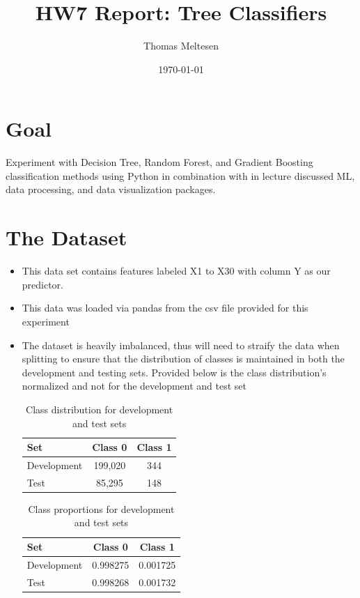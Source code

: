\documentclass[12pt]{article}
\title {HW7 Report: Tree Classifiers}
\author{Thomas Meltesen}
\date{\today}
\begin{document}
\maketitle

\section{Goal}
Experiment with Decision Tree, Random Forest, and Gradient Boosting
classification methods using Python in combination with in lecture discussed ML, data processing, and data
visualization packages.

\section{The Dataset}
\begin{itemize}
    \item This data set contains features labeled X1 to X30 with column Y as our predictor.
    \item This data was loaded via pandas from the csv file provided for this experiment
    \item The dataset is heavily imbalanced, thus will need to straify the data when splitting to ensure that the distribution of classes is maintained in both the development and testing sets. Provided below is the class distribution's normalized and not for the development and test set
\begin{table}[h!]
\centering
\begin{tabular}{lcc}
\hline
\textbf{Set} & \textbf{Class 0} & \textbf{Class 1} \\
\hline
Development & 199,020 & 344 \\
Test        & 85,295  & 148 \\
\hline
\end{tabular}
\caption{Class distribution for development and test sets}
\end{table}

\begin{table}[h!]
\centering
\begin{tabular}{lcc}
\hline
\textbf{Set} & \textbf{Class 0 } & \textbf{Class 1} \\
\hline
Development & 0.998275 & 0.001725 \\
Test        & 0.998268 & 0.001732 \\
\hline
\end{tabular}
\caption{Class proportions for development and test sets}
\end{table}


\end{itemize}
\end{document}
